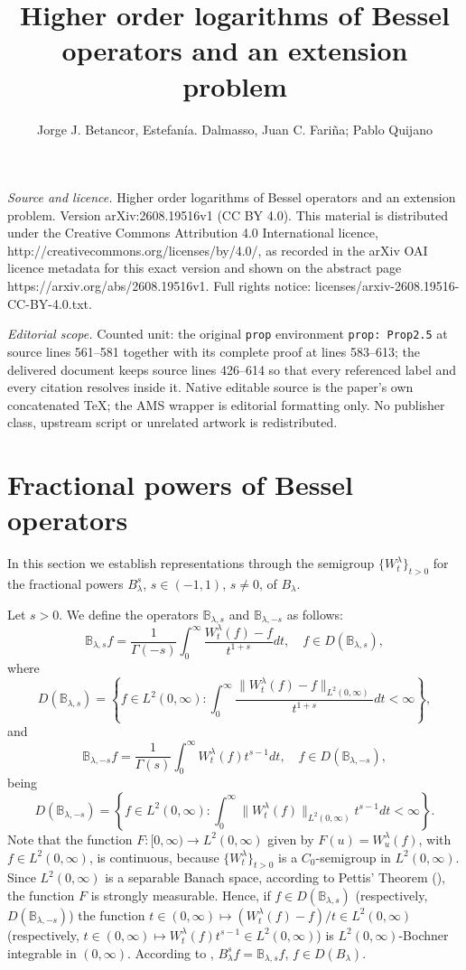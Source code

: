\documentclass[10pt,a4paper]{amsart}
\numberwithin{equation}{section}
\begin{document}
\title[Higher order logarithms of Bessel operators and an extension]{Higher order logarithms of Bessel operators and an extension problem}
\author{Jorge J. Betancor, Estefanía. Dalmasso, Juan C. Fariña; Pablo Quijano}
\date{}
\maketitle
\noindent\emph{Source and licence.} Higher order logarithms of Bessel operators and an extension problem. Version arXiv:2608.19516v1 (CC BY 4.0). This material is distributed under the Creative Commons Attribution 4.0 International licence, http://creativecommons.org/licenses/by/4.0/, as recorded in the arXiv OAI licence metadata for this exact version and shown on the abstract page https://arxiv.org/abs/2608.19516v1. Full rights notice: licenses/arxiv-2608.19516-CC-BY-4.0.txt.\par\smallskip
\noindent\textit{Editorial scope.} Counted unit: the original \texttt{prop} environment \texttt{prop: Prop2.5} at source lines 561--581 together with its complete proof at lines 583--613; the delivered document keeps source lines 426--614 so that every referenced label and every citation resolves inside it. Native editable source is the paper's own concatenated TeX; the AMS wrapper is editorial formatting only. No publisher class, upstream script or unrelated artwork is redistributed.
\section{Fractional powers of Bessel operators}\label{sec: fract powers}

In this section we establish representations through the semigroup $\{W_t^\lambda \}_{t>0}$ for the fractional powers $B_\lambda^s$, $s\in (-1,1)$, $s\neq 0$, of $B_\lambda$.


Let $s>0$. We define the operators $\mathbb B_{\lambda ,s}$ and $\mathbb B_{\lambda ,-s}$ as follows:
\[
\mathbb B_{\lambda, s}f=\frac{1}{\Gamma (-s)}\int_0^\infty \frac{W_t^\lambda (f)-f}{t^{1+s}}dt,\quad f\in D(\mathbb B_{\lambda, s}),
\]
where
\[
D(\mathbb B_{\lambda, s})=\left\{f\in L^2(0,\infty): \int_0^\infty \frac{\|W_t^\lambda (f)-f\|_{L^2(0,\infty)}}{t^{1+s}}dt<\infty\right\},
\]
and 
\[
\mathbb B_{\lambda, -s}f=\frac{1}{\Gamma (s)}\int_0^\infty W_t^\lambda (f)t^{s-1}dt,\quad f\in D(\mathbb B_{\lambda, -s}),
\]
being
\[
D(\mathbb B_{\lambda, -s})=\left\{f\in L^2(0,\infty): \int_0^\infty \|W_t^\lambda (f)\|_{L^2(0,\infty)}t^{s-1}dt<\infty\right\}.
\]
Note that the function $F:[0,\infty)\to L^2(0,\infty)$ given by $F(u)=W_u^\lambda (f)$, with $f\in L^2(0,\infty)$, is continuous, because $\{W_t^\lambda \}_{t>0}$ is a $C_0$-semigroup in $L^2(0,\infty)$. Since $L^2(0,\infty)$ is a separable Banach space, according to Pettis' Theorem (\cite[p. 131]{Yo}), the function $F$ is strongly measurable. Hence, if $f\in D(\mathbb B_{\lambda ,s})$ (respectively, $D(\mathbb B_{\lambda ,-s})$) the function $t\in (0,\infty)\mapsto (W_t^\lambda (f)-f)/t\in L^2(0,\infty)$ (respectively, $t\in (0,\infty)\mapsto W_t^\lambda (f)t^{s-1}\in L^2(0,\infty)$) is $L^2(0,\infty)$-Bochner integrable in $(0,\infty)$. According to \cite[(3), p. 260]{Yo}, $B_\lambda^sf=\mathbb B_{\lambda ,s}f$, $f\in D(B_\lambda)$. 
\end{document}
